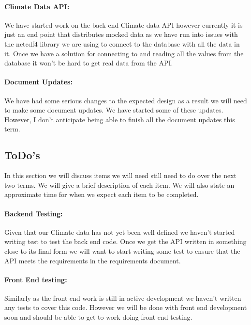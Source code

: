 \documentclass[onecolumn, draftclsnofoot,10pt, compsoc]{article}
\begin{document}
		\paragraph{Climate Data API:} We have started work on the back end Climate data API however currently it is just an end point that distributes mocked data as we have run into issues with the netcdf4 library we are using to connect to the database with all the data in it. Once we have a solution for connecting to and reading all the values from the database it won't be hard to get real data from the API.\\

		\paragraph{Document Updates:} We have had some serious changes to the expected design as a result we will need to make some document updates. We have started some of these updates. However, I don't anticipate being able to finish all the document updates this term.\\

	\subsection{ToDo's}
	    In this section we will discuss items we will need still need to do over the next two terms. We will give a brief description of each item. We will also state an approximate time for when we expect each item to be completed.\\

			\paragraph{Backend Testing:} Given that our Climate data has not yet been well defined we haven't started writing test to test the back end code. Once we get the API written in something close to its final form we will want to start writing some test to ensure that the API meets the requirements in the requirements document.\\

			\paragraph{Front End testing:} Similarly as the front end work is still in active development we haven’t written any tests to cover this code. However we will be done with front end development soon and should be able to get to work doing front end testing.\\
\end{document}
